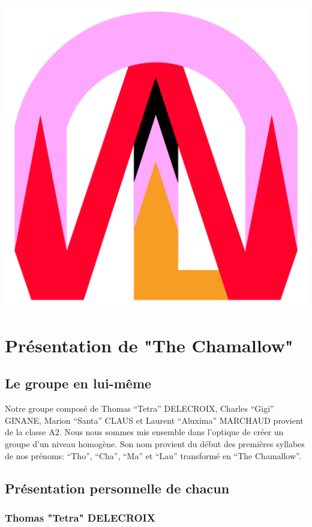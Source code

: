 \documentclass[a4paper]{article}
\begin{document}
\begin{centering}

\includegraphics[scale=0.25]{Logo.png}

\end{centering}
\newpage

\section{Présentation de "The Chamallow"}
	\subsection{Le groupe en lui-même }


    Notre groupe composé de Thomas “Tetra” DELECROIX, Charles “Gigi” GINANE, Marion “Santa” CLAUS et Laurent “Aluxima” MARCHAUD provient de la classe A2. Nous nous sommes mis ensemble dans l’optique de créer un groupe d’un niveau homogène.
Son nom provient du début des premières syllabes de nos prénoms: “Tho”, “Cha”, “Ma” et “Lau” transformé en “The Chamallow”.
 


	\subsection{Présentation personnelle de chacun}
		\subsubsection{Thomas "Tetra" DELECROIX }
			
\end{document}
